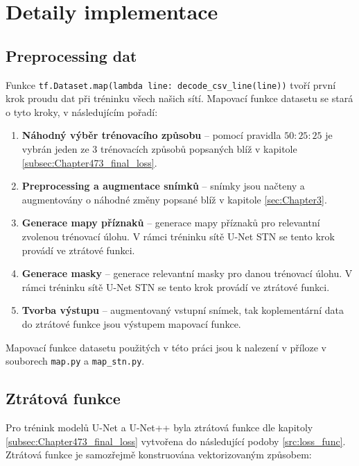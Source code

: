\section{Detaily implementace}
\label{sec:Chapter55}

\subsection{Preprocessing dat}
Funkce \texttt{tf.Dataset.map(lambda line: decode\_csv\_line(line))} tvoří první krok proudu dat při tréninku všech našich sítí. Mapovací funkce datasetu se stará o tyto kroky, v následujícím pořadí:
\begin{enumerate}
    \item \textbf{Náhodný výběr trénovacího způsobu} -- pomocí pravidla $50:25:25$ je vybrán jeden ze 3 trénovacích způsobů popsaných blíž v kapitole \ref{subsec:Chapter473_final_loss}.
    \item \textbf{Preprocessing a augmentace snímků} -- snímky jsou načteny a augmentovány o náhodné změny popsané blíž v kapitole \ref{sec:Chapter3}.
    \item \textbf{Generace mapy příznaků} -- generace mapy příznaků pro relevantní zvolenou trénovací úlohu. V rámci tréninku sítě U-Net STN se tento krok provádí ve ztrátové funkci.
    \item \textbf{Generace masky} -- generace relevantní masky pro danou trénovací úlohu. V rámci tréninku sítě U-Net STN se tento krok provádí ve ztrátové funkci.
    \item \textbf{Tvorba výstupu} -- augmentovaný vstupní snímek, tak koplementární data do ztrátové funkce jsou výstupem mapovací funkce.
\end{enumerate}

Mapovací funkce datasetu použitých v této práci jsou k nalezení v příloze v souborech \texttt{map.py} a \texttt{map\_stn.py}.



\subsection{Ztrátová funkce}
\label{subsec:Chapter55_loss_func}

Pro trénink modelů U-Net a U-Net++ byla ztrátová funkce dle kapitoly \ref{subsec:Chapter473_final_loss} vytvořena do následující podoby \ref{src:loss_func}. Ztrátová funkce je samozřejmě konstruována vektorizovaným způsobem:

\label{src:loss_func}


